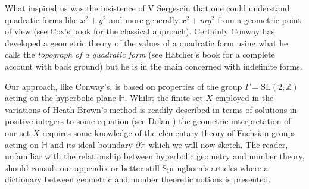 \documentclass[12pt,a4paper]{amsart}
\def\ZZ{\mathbb{Z}}
\def\sl2{\mathrm{SL}(2, \ZZ)}
\begin{document}
What inspired us was the insistence of V Sergesciu that one could
understand quadratic forms like $x^2 +y^2$ and more generally $x^2 + my^2$
from a geometric point of view (see Cox's book \cite{cox} for the classical approach).
Certainly Conway \cite{conway} has developed a geometric theory of 
the values of a quadratic form using what he calls the
\textit{topograph of a quadratic form}
(see Hatcher's book \cite{hatcher} for a complete account with back
ground)
but he is in the main concerned with indefinite forms.

Our approach, like Conway's, is based on properties of  the group
$\Gamma=\sl2$ acting on the hyperbolic plane $\mathbb{H}$.
Whilst the finite set $X$ employed in the variations of
Heath-Brown's method is readily described in terms of solutions
in positive integers to some equation (see  Dolan \cite{dolan}) 
the geometric interpretation of our set $X$ requires some knowledge
of the elementary theory of Fuchsian groups acting on $\mathbb{H}$ and
its ideal boundary $\partial \mathbb{H}$ which we will now sketch.
The reader, unfamiliar with the relationship between hyperbolic
geometry and number theory,
should consult our appendix or better still Springborn's articles \cite{springborn1, springborn2}
where a dictionary between geometric and number theoretic notions is presented.
\end{document}
